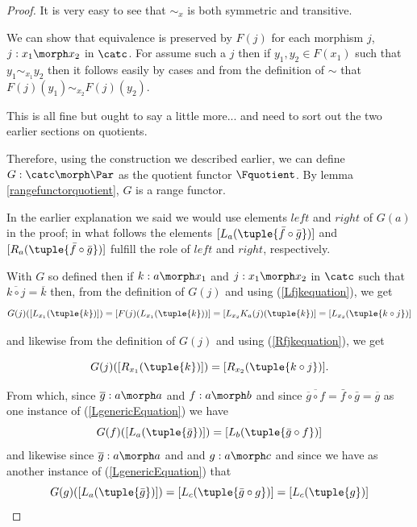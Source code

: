 \begin{proof}
It is very easy to see that $\sim_x$  is both symmetric and transitive. 

We can show that equivalence is preserved by  $F(j)$ for each morphism $j$, $j: x_1 \morph x_2$ in $\catc$. For assume such a $j$ then 
if $y_1,y_2 \in F(x_1)$ such that $y_1 \sim_{x_1} y_2$
then it follows easily by cases and from the definition of $\sim$ that $F(j)(y_1) \sim_{x_2} F(j)(y_2)$.
\begin{worktt}This is all fine but ought to say a little more...
and need to sort out the two earlier sections on quotients.
\end{worktt}

Therefore, using the construction we described earlier, 
we can define 
 $G: \catc \morph \Par$  as the quotient functor $\Fquotient$.
By lemma \ref{rangefunctorquotient}, $G$ is a range functor.

In the earlier explanation we said we would use elements $left$ and $right$ of $G(a)$
in the proof; in what follows
the elements
$[L_a(\tuple{\bar{f}\circ \bar{g}})]$ and $[R_a(\tuple{\bar{f}\circ \bar{g}})]$ fulfill the role of $left$ and $right$, respectively.

With $G$ so defined then if $k: a \morph x_1$ and $j:x_1 \morph x_2$ in $\catc$ such that $\overline{k \circ j}=\overline{k}$
then, from the definition of $G(j)$ and using  (\ref{Lfjkequation}), we get
\begin{equation}
\label{LgenericEquation}
G(j)([L_{x_1}(\tuple{k})])
=[F(j)(L_{x_1}(\tuple{k}))] 
= [L_{x_2}K_a(j)(\tuple{k})]  
=[L_{x_2}(\tuple{k \circ j})]
\end{equation}

 and likewise from the definition of $G(j)$ and using  (\ref{Rfjkequation}), we get

\begin{equation} 
G(j)([R_{x_1}(\tuple{k})])=[R_{x_2}(\tuple{k \circ j})].
\end{equation} 

From which, since $\overline{g}: a \morph a$ and $f:a \morph b$  
and since $\overline{\overline{g}\circ f} = \bar{f} \circ \bar{g} = \overline{g}$
as one instance of (\ref{LgenericEquation}) we have 
\begin{equation}
\label{Lfequation}
G(f)([L_a(\tuple{\bar{g}})])=[L_{b}(\tuple{\bar{g} \circ f})]
\end{equation}
and likewise since $\overline{g}: a \morph a$ and  and $g:a \morph c$  
and since 
 we have as another instance of (\ref{LgenericEquation}) that
\begin{equation}
\label{Lgequation}
G(g)([L_a(\tuple{\bar{g}})])=[L_{c}(\tuple{\bar{g} \circ g})]=[L_{c}(\tuple{g})]
\end{equation}


\end{proof}
